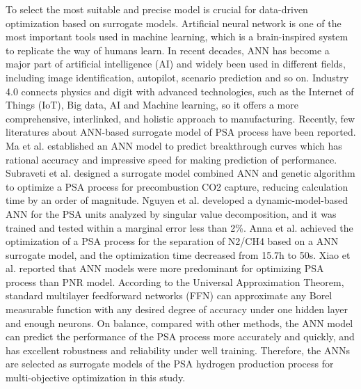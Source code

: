 \documentclass[preprint,12pt]{elsarticle}
\begin{document}
	To select the most suitable and precise model is crucial for data-driven optimization based on surrogate models. Artificial neural network is one of the most important tools used in machine learning, which is a brain-inspired system to replicate the way of humans learn. In recent decades, ANN has become a major part of artificial intelligence (AI) and widely been used in different fields, including image identification, autopilot, scenario prediction and so on. Industry 4.0 connects physics and digit with advanced technologies, such as the Internet of Things (IoT), Big data, AI and Machine learning, so it offers a more comprehensive, interlinked, and holistic approach to manufacturing\cite{RN37}. Recently, few literatures about ANN-based surrogate model of PSA process have been reported. Ma et al. established an ANN model to predict breakthrough curves which has rational accuracy and impressive speed for making prediction of performance\cite{RN38}. Subraveti et al. designed a surrogate model combined ANN and genetic algorithm to optimize a PSA process for precombustion CO2 capture, reducing calculation time by an order of magnitude\cite{RN29}. Nguyen et al. developed a dynamic-model-based ANN for the PSA units analyzed by singular value decomposition, and it was trained and tested within a marginal error less than 2\%\cite{RN35}. Anna et al. achieved the optimization of a PSA process for the separation of N2/CH4 based on a ANN surrogate model, and the optimization time decreased from 15.7h to 50s\cite{RN39}. Xiao et al. reported that ANN models were more predominant for optimizing PSA process than PNR model\cite{RN19}. According to the Universal Approximation Theorem, standard multilayer feedforward networks (FFN) can approximate any Borel measurable function with any desired degree of accuracy under one hidden layer and enough neurons\cite{RN40}. On balance, compared with other methods, the ANN model can predict the performance of the PSA process more accurately and quickly, and has excellent robustness and reliability under well training. Therefore, the ANNs are selected as surrogate models of the PSA hydrogen production process for multi-objective optimization in this study. 
	
\end{document}
